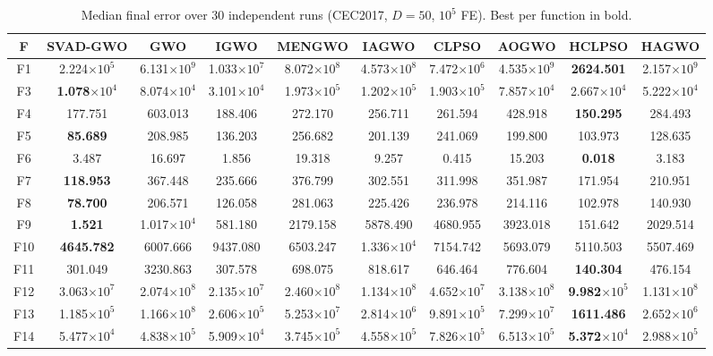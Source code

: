 \begin{table}[t]
\centering
\caption{Median final error over 30 independent runs (CEC2017, $D=50$, $10^5$ FE). Best per function in bold.}
\label{tab:main}
\begin{tabular}{cccccccccc}
\hline
F & SVAD-GWO & GWO & IGWO & MENGWO & IAGWO & CLPSO & AOGWO & HCLPSO & HAGWO \\
\hline
F1 & 2.224$\times10^{5}$ & 6.131$\times10^{9}$ & 1.033$\times10^{7}$ & 8.072$\times10^{8}$ & 4.573$\times10^{8}$ & 7.472$\times10^{6}$ & 4.535$\times10^{9}$ & \textbf{2624.501} & 2.157$\times10^{9}$ \\
F3 & \textbf{1.078$\times10^{4}$} & 8.074$\times10^{4}$ & 3.101$\times10^{4}$ & 1.973$\times10^{5}$ & 1.202$\times10^{5}$ & 1.903$\times10^{5}$ & 7.857$\times10^{4}$ & 2.667$\times10^{4}$ & 5.222$\times10^{4}$ \\
F4 & 177.751 & 603.013 & 188.406 & 272.170 & 256.711 & 261.594 & 428.918 & \textbf{150.295} & 284.493 \\
F5 & \textbf{85.689} & 208.985 & 136.203 & 256.682 & 201.139 & 241.069 & 199.800 & 103.973 & 128.635 \\
F6 & 3.487 & 16.697 & 1.856 & 19.318 & 9.257 & 0.415 & 15.203 & \textbf{0.018} & 3.183 \\
F7 & \textbf{118.953} & 367.448 & 235.666 & 376.799 & 302.551 & 311.998 & 351.987 & 171.954 & 210.951 \\
F8 & \textbf{78.700} & 206.571 & 126.058 & 281.063 & 225.426 & 236.978 & 214.116 & 102.978 & 140.930 \\
F9 & \textbf{1.521} & 1.017$\times10^{4}$ & 581.180 & 2179.158 & 5878.490 & 4680.955 & 3923.018 & 151.642 & 2029.514 \\
F10 & \textbf{4645.782} & 6007.666 & 9437.080 & 6503.247 & 1.336$\times10^{4}$ & 7154.742 & 5693.079 & 5110.503 & 5507.469 \\
F11 & 301.049 & 3230.863 & 307.578 & 698.075 & 818.617 & 646.464 & 776.604 & \textbf{140.304} & 476.154 \\
F12 & 3.063$\times10^{7}$ & 2.074$\times10^{8}$ & 2.135$\times10^{7}$ & 2.460$\times10^{8}$ & 1.134$\times10^{8}$ & 4.652$\times10^{7}$ & 3.138$\times10^{8}$ & \textbf{9.982$\times10^{5}$} & 1.131$\times10^{8}$ \\
F13 & 1.185$\times10^{5}$ & 1.166$\times10^{8}$ & 2.606$\times10^{5}$ & 5.253$\times10^{7}$ & 2.814$\times10^{6}$ & 9.891$\times10^{5}$ & 7.299$\times10^{7}$ & \textbf{1611.486} & 2.652$\times10^{6}$ \\
F14 & 5.477$\times10^{4}$ & 4.838$\times10^{5}$ & 5.909$\times10^{4}$ & 3.745$\times10^{5}$ & 4.558$\times10^{5}$ & 7.826$\times10^{5}$ & 6.513$\times10^{5}$ & \textbf{5.372$\times10^{4}$} & 2.988$\times10^{5}$ \\

\end{tabular}
\end{table}
